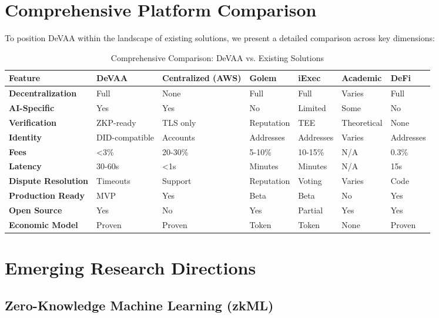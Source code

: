 \section{Comprehensive Platform Comparison}

To position DeVAA within the landscape of existing solutions, we present a detailed comparison across key dimensions:

\begin{table}[h!]
\centering
\caption{Comprehensive Comparison: DeVAA vs. Existing Solutions}
\label{tab:comprehensive-comparison}
\footnotesize
\begin{tabular}{p{2.5cm}p{2cm}p{2cm}p{2cm}p{2cm}p{2cm}p{1.5cm}}
\toprule
\textbf{Feature} & \textbf{DeVAA} & \textbf{Centralized (AWS)} & \textbf{Golem} & \textbf{iExec} & \textbf{Academic} & \textbf{DeFi} \\
\midrule
\textbf{Decentralization} & Full & None & Full & Full & Varies & Full \\
\textbf{AI-Specific} & Yes & Yes & No & Limited & Some & No \\
\textbf{Verification} & ZKP-ready & TLS only & Reputation & TEE & Theoretical & None \\
\textbf{Identity} & DID-compatible & Accounts & Addresses & Addresses & Varies & Addresses \\
\textbf{Fees} & <3\% & 20-30\% & 5-10\% & 10-15\% & N/A & 0.3\% \\
\textbf{Latency} & 30-60s & <1s & Minutes & Minutes & N/A & 15s \\
\textbf{Dispute Resolution} & Timeouts & Support & Reputation & Voting & Varies & Code \\
\textbf{Production Ready} & MVP & Yes & Beta & Beta & No & Yes \\
\textbf{Open Source} & Yes & No & Yes & Partial & Yes & Yes \\
\textbf{Economic Model} & Proven & Proven & Token & Token & None & Proven \\
\bottomrule
\end{tabular}
\end{table}

\section{Emerging Research Directions}

\subsection{Zero-Knowledge Machine Learning (zkML)}

